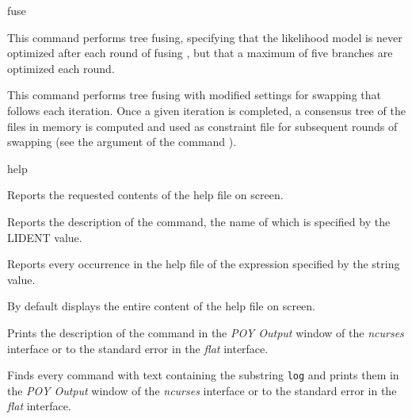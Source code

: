 \begin{command}{fuse}{}
\begin{poyexamples}
            {This command performs tree fusing, specifying that the likelihood model is never optimized 
            after each round of fusing , but that a maximum of five branches are optimized
            each round.}
            
            {This command performs tree fusing  
            with modified settings for swapping that follows each iteration. Once
            a given iteration is completed, a consensus tree of the files in memory
            is computed and used as constraint file for subsequent rounds of swapping (see
            the argument  of the command
            ).}    

     \end{poyexamples}
        
        \begin{poyalso}
    \end{poyalso}

\end{command}

   
\begin{command}{help}{}

	
	\begin{poydescription}
         Reports the requested contents of the help file on screen.
	\end{poydescription}
	
	\begin{arguments}
            {Reports the description of the command, the name of which is specified by the
            LIDENT value.}
            {}

            {Reports every occurrence in the help file of the expression specified by the string value.}
            {}
	\end{arguments}
	
	\poydefaults{}
        {By default \poy displays the entire content of the help file on screen.}
        
	\begin{poyexamples}
            {Prints the description of the command
             in the \emph{POY Output} window of the \emph{ncurses}
            interface or to the standard error in the \emph{flat} interface.}

            {Finds every command with text containing the substring \texttt{log} and
            prints them in the \emph{POY Output} window of the \emph{ncurses}
            interface or to the standard error in the \emph{flat} interface.}

	\end{poyexamples}

\end{command}

